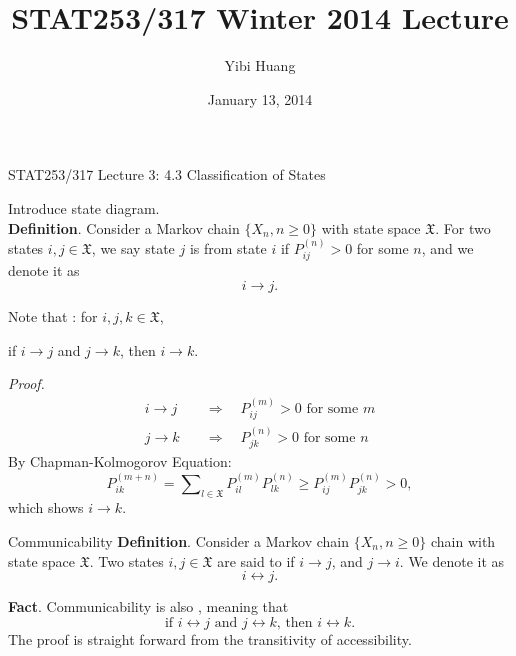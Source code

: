 \documentclass[letterpaper, mathserif]{beamer}
\title{STAT253/317 Winter 2014 Lecture \chapnum}
\date{January 13, 2014}
\author{Yibi Huang}
\def\Sum{\sum\nolimits}
\def\X{\mathfrak{X}}
\begin{document}
\begin{frame}{STAT253/317 Lecture 3: 4.3 Classification of States}
\medskip

Introduce state diagram. \\

\noindent\textbf{Definition}. Consider a Markov chain $\{X_n, n\ge 0\}$ with state space $\X$.
For two states $i,j\in \X$, we say state $j$ is  from state $i$ if $P^{(n)}_{ij}>0$ for some $n$, and we denote it as $$i\to j.$$

Note that : for $i,j,k\in\X$,\\
\centerline{if $i\to j$ and $j\to k$, then $i\to k$.}
{\em Proof.}
\begin{align*}
i\to j\quad &\Rightarrow\quad P^{(m)}_{ij}>0\text{ for some }m\\
j\to k\quad &\Rightarrow\quad P^{(n)}_{jk}>0\text{ for some }n
\end{align*}
By Chapman-Kolmogorov Equation:
$$P_{ik}^{(m+n)}=\Sum_{l\in\X}P_{il}^{(m)}P_{lk}^{(n)}\ge P_{ij}^{(m)}P_{jk}^{(n)}>0,$$
which shows $i\to k$.
\end{frame}
\begin{frame}{Communicability}\medskip
\noindent\textbf{Definition}. Consider a Markov chain $\{X_n, n\ge 0\}$ chain with state space $\X$.
Two states $i,j\in \X$ are said to  if $i\to j$, and $j\to i$.
We denote it as $$i\longleftrightarrow j.$$\bigskip


\noindent\textbf{Fact}.
Communicability is also , meaning that
\[
\text{if }i\longleftrightarrow j\text{ and }j\longleftrightarrow k\text{, then }i\longleftrightarrow k.
\]
The proof is straight forward from the transitivity of accessibility.
\end{frame}
\end{document}
